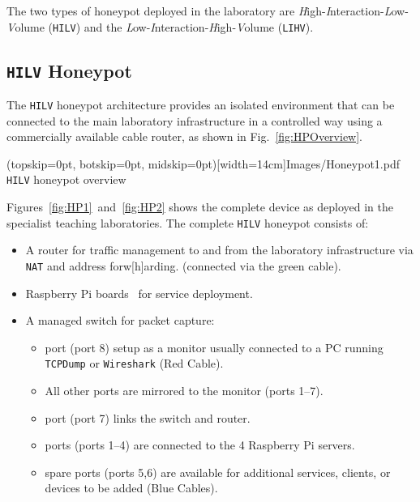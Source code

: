 \documentclass{ieeeaccess}
\begin{document}
The two types of honeypot deployed in the laboratory are
\emph{H}igh-\emph{I}nteraction-\emph{L}ow-\emph{V}olume (\texttt{HILV}) and the
\emph{L}ow-\emph{I}nteraction-\emph{H}igh-\emph{V}olume (\texttt{LIHV}).

\subsection{\texttt{HILV} Honeypot}

The \texttt{HILV} honeypot architecture provides an isolated environment that
can be connected to the main laboratory infrastructure in a controlled way
using a commercially available cable router, as shown in
Fig.~\ref{fig:HPOverview}.

\Figure[t!](topskip=0pt, botskip=0pt, midskip=0pt)[width=14cm]{Images/Honeypot1.pdf}
{\texttt{HILV} honeypot overview\label{fig:HPOverview}}


Figures~\ref{fig:HP1}~and~\ref{fig:HP2} shows the complete device as deployed
in the specialist teaching laboratories. The complete \texttt{HILV} honeypot
consists of:

\begin{itemize}
    \item \noindent A router for traffic management to and from the laboratory
      infrastructure via \texttt{NAT} and address forw[h]arding. (connected via the
      green cable). 
    \item {} Raspberry Pi boards~\cite{RASP:17} for service deployment.
    \item \noindent A managed switch for packet capture:
    \begin{itemize}
        \item {} port (port 8) setup as a monitor usually connected to
          a PC running \texttt{TCPDump} or \texttt{Wireshark} (Red Cable).
        \item \noindent All other ports are mirrored to the monitor (ports
          1--7).
        \item {} port (port 7) links the switch and router.
        \item {} ports (ports 1--4) are connected to the 4 Raspberry Pi 
        servers.
        \item {} spare ports (ports 5,6) are available for additional
          services, clients, or devices to be added (Blue Cables).
    \end{itemize}
\end{itemize}
\end{document}
